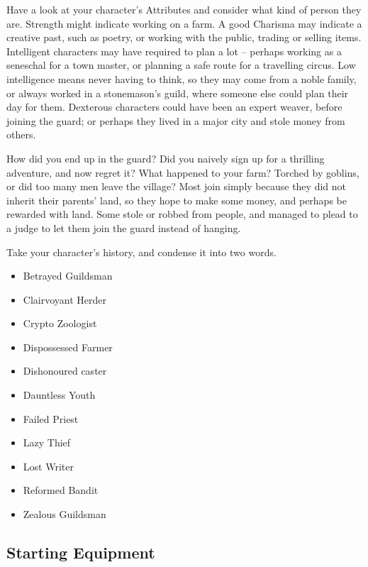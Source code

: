 \begin{multicols}{2}
Have a look at your character's Attributes and consider what kind of person they are.
Strength might indicate working on a farm.
A good Charisma may indicate a creative past, such as poetry, or working with the public, trading or selling items.
Intelligent characters may have required to plan a lot -- perhaps working as a seneschal for a town master, or planning a safe route for a travelling circus.
Low intelligence means never having to think, so they may come from a noble family, or always worked in a stonemason's guild, where someone else could plan their day for them.
Dexterous characters could have been an expert weaver, before joining the \gls{guard}; or perhaps they lived in a major city and stole money from others.

How did you end up in the \gls{guard}?
Did you naively sign up for a thrilling adventure, and now regret it?
What happened to your farm?
Torched by goblins, or did too many men leave the village?
Most join simply because they did not inherit their parents' land, so they hope to make some money, and perhaps be rewarded with land.
Some stole or robbed from people, and managed to plead to a judge to let them join the \gls{guard} instead of hanging.

Take your character's history, and condense it into two words.

\begin{multicols}{2}
\begin{itemize}
  \item
  Betrayed Guildsman
  \item
  Clairvoyant Herder
  \item
  Crypto Zoologist
  \item
  Dispossessed Farmer
  \item
  Dishonoured \gls{caster}
  \item
  Dauntless Youth
  \item
  Failed Priest
  \item
  Lazy Thief
  \item
  Lost Writer
  \item
  Reformed Bandit
  \item
  Zealous Guildsman
\end{itemize}
\end{multicols}

\subsection{Starting Equipment}
\label{start_equipment}


\end{multicols}
